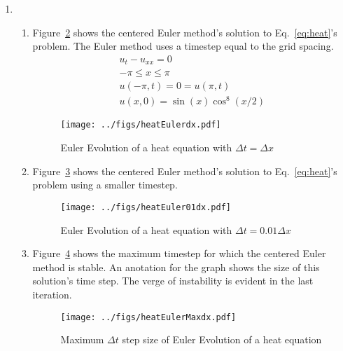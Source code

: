 \documentclass[12pt,a4]{article}
\begin{document}
\begin{enumerate}
\begin{enumerate}
      \item
        Figure~\ref{fig:centeredEuler} shows the centered Euler method's solution to Eq.~\ref{eq:advec}'s problem.
        \begin{figure}[H]
          \centering
          \texttt{[image: ../figs/centeredEuler.pdf]}
          \caption{Centered derivative and Euler Evolution of an advection equation  with $\Delta t = \Delta x$ and error}
          \label{fig:centeredEuler}
        \end{figure}
    \end{enumerate}

  \item
    \begin{enumerate}
      \item
        Figure~\ref{fig:heatEulerdx} shows the centered Euler method's solution to Eq.~\ref{eq:heat}'s problem.
        The Euler method uses a timestep equal to the grid spacing.
        \begin{equation}
          \begin{gathered}
            u_t - u_{xx} = 0\\
            - \pi \leq x \leq \pi\\
            u(-\pi, t) = 0 = u(\pi, t)\\
            u(x, 0) = \sin(x) \cos^8(x / 2)
          \end{gathered}
          \label{eq:heat}
        \end{equation}

        \begin{figure}[H]
          \centering
          \texttt{[image: ../figs/heatEulerdx.pdf]}
          \caption{Euler Evolution of a heat equation with $\Delta t = \Delta x$}
          \label{fig:heatEulerdx}
        \end{figure}

      \item
        Figure~\ref{fig:heatEuler01dx} shows the centered Euler method's solution to Eq.~\ref{eq:heat}'s problem using a smaller timestep.
        \begin{figure}[H]
          \centering
          \texttt{[image: ../figs/heatEuler01dx.pdf]}
          \caption{Euler Evolution of a heat equation with $\Delta t = 0.01 \Delta x$}
          \label{fig:heatEuler01dx}
        \end{figure}

      \item
        Figure~\ref{fig:heatEulerMaxdx} shows the maximum timestep for which the centered Euler method is stable.
        An anotation for the graph shows the size of this solution's time step.
        The verge of instability is evident in the last iteration.
        \begin{figure}[H]
          \centering
          \texttt{[image: ../figs/heatEulerMaxdx.pdf]}
          \caption{Maximum $\Delta t$ step size of Euler Evolution of a heat equation}
          \label{fig:heatEulerMaxdx}
        \end{figure}


\end{enumerate}
\end{enumerate}
\end{document}
